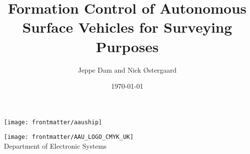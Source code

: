 \author{Jeppe Dam and Nick Østergaard}
\title{\textbf{\Huge{Formation Control of Autonomous Surface Vehicles for Surveying Purposes}}}
\date{\today}
\maketitle
\thispagestyle{empty}
\vspace{3cm}
\begin{center}
	\texttt{[image: frontmatter/aauship]}
\end{center}
\vfill
\begin{center}
	\texttt{[image: frontmatter/AAU\_LOGO\_CMYK\_UK]}\\
	Department of Electronic Systems
\end{center}
\clearpage
\restoregeometry

